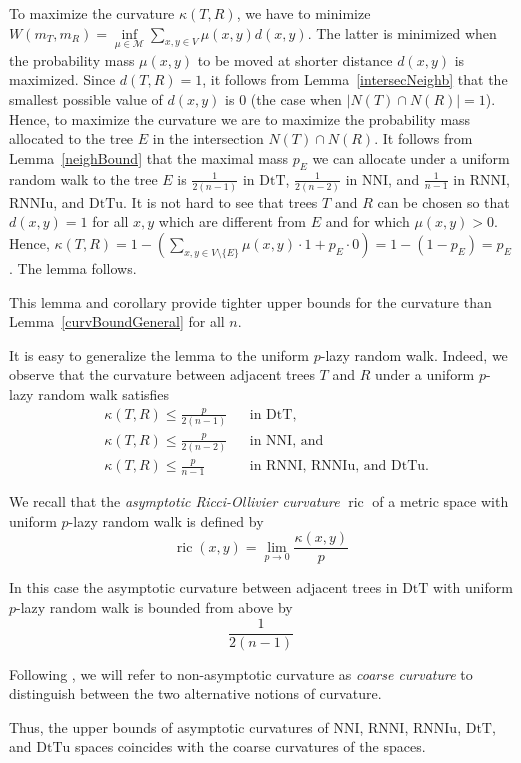\documentclass[11pt]{amsart}
\theoremstyle{definition}
\newcommand{\nni}{\mathrm{NNI}}
\newcommand{\rnni}{\mathrm{RNNI}}
\newcommand{\rnniu}{\mathrm{RNNIu}}
\newcommand{\dtt}{\mathrm{DtT}}
\newcommand{\dttu}{\mathrm{DtTu}}
\newcommand{\ric}{\operatorname{ric}}
\newcommand{\M}{\mathcal{M}}
\begin{document}
{\proof
To maximize the curvature $\kappa(T,R)$, we have to minimize $W(m_T,m_R) = \inf\limits_{\mu\in\M} \sum\limits_{x,y\in V}\mu(x,y) d(x,y)$.
The latter is minimized when the probability mass $\mu(x,y)$ to be moved at shorter distance $d(x,y)$ is maximized.
Since $d(T,R) = 1$, it follows from Lemma~\ref{intersecNeighb} that the smallest possible value of $d(x,y)$ is $0$ (the case when $|N(T) \cap N(R)| = 1$).
Hence, to maximize the curvature we are to maximize the probability mass allocated to the tree $E$ in the intersection $N(T) \cap N(R)$.
It follows from Lemma~\ref{neighBound} that the maximal mass $p_E$ we can allocate under a uniform random walk to the tree $E$ is $\frac{1}{2(n-1)}$ in $\dtt$, $\frac{1}{2(n-2)}$ in $\nni$, and $\frac{1}{n-1}$ in $\rnni$, $\rnniu$, and $\dttu$.
It is not hard to see that trees $T$ and $R$ can be chosen so that $d(x,y) = 1$ for all $x,y$ which are different from $E$ and for which $\mu(x,y) > 0$.
Hence, $\kappa(T, R) = 1 - \left(\sum\limits_{x,y\in V\setminus\{E\}}\mu(x,y)\cdot 1 + p_E \cdot 0\right) = 1 - (1-p_E) = p_E$.
The lemma follows.
\endproof

This lemma and corollary provide tighter upper bounds for the curvature than Lemma~\ref{curvBoundGeneral} for all $n$.

It is easy to generalize the lemma to the uniform $p$-lazy random walk.
Indeed, we observe that the curvature between adjacent trees $T$ and $R$ under a uniform $p$-lazy random walk satisfies
\begin{align*}
& \kappa(T,R) \leq \frac{p}{2(n-1)}	&& \mbox{in $\dtt$,}\\
& \kappa(T,R) \leq \frac{p}{2(n-2)}	&& \mbox{in $\nni$, and}\\
& \kappa(T,R) \leq \frac{p}{n-1}	&& \mbox{in $\rnni$, $\rnniu$, and $\dttu$.}
\end{align*}

We recall that the \emph{asymptotic Ricci-Ollivier curvature} \autocite{Loisel2014-gu} $\ric$ of a metric space with uniform $p$-lazy random walk is defined by
\[
\ric(x,y) = \lim_{p\to0} \frac{\kappa(x,y)}{p}
\]

In this case the asymptotic curvature between adjacent trees in $\dtt$ with uniform $p$-lazy random walk is bounded from above by
\[
\frac{1}{2(n-1)}
\]

Following \textcite{Loisel2014-gu}, we will refer to non-asymptotic curvature as \emph{coarse curvature} to distinguish between the two alternative notions of curvature.

Thus, the upper bounds of asymptotic curvatures of $\nni$, $\rnni$, $\rnniu$, $\dtt$, and $\dttu$ spaces coincides with the coarse curvatures of the spaces.

}
\end{document}
